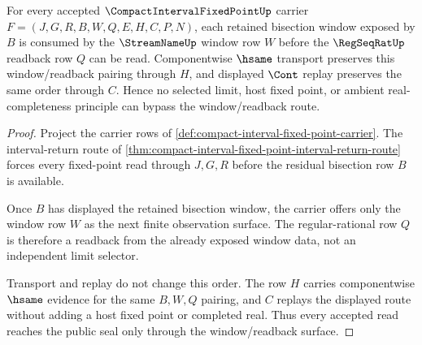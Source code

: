 \begin{theorem}
\label{thm:compact-interval-fixed-point-window-regularity}
For every accepted $\CompactIntervalFixedPointUp$ carrier $F=(J,G,R,B,W,Q,E,H,C,P,N)$, each retained bisection window exposed by $B$ is consumed by the $\StreamNameUp$ window row $W$ before the $\RegSeqRatUp$ readback row $Q$ can be read. Componentwise $\hsame$ transport preserves this window/readback pairing through $H$, and displayed $\Cont$ replay preserves the same order through $C$. Hence no selected limit, host fixed point, or ambient real-completeness principle can bypass the window/readback route.
\end{theorem}
\begin{proof}
Project the carrier rows of \autoref{def:compact-interval-fixed-point-carrier}. The interval-return route of \autoref{thm:compact-interval-fixed-point-interval-return-route} forces every fixed-point read through $J,G,R$ before the residual bisection row $B$ is available.

Once $B$ has displayed the retained bisection window, the carrier offers only the window row $W$ as the next finite observation surface. The regular-rational row $Q$ is therefore a readback from the already exposed window data, not an independent limit selector.

Transport and replay do not change this order. The row $H$ carries componentwise $\hsame$ evidence for the same $B,W,Q$ pairing, and $C$ replays the displayed route without adding a host fixed point or completed real. Thus every accepted read reaches the public seal only through the window/readback surface.
\end{proof}

